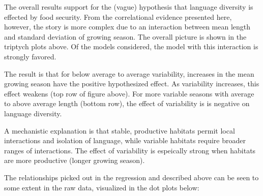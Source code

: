 \documentclass{article}
\begin{document}
The overall results support for the (vague) hypothesis that language diversity is effected by food security. 
From the correlational evidence presented here, however, the story is more complex due to an interaction between mean length and standard deviation of growing season.
The overall picture is shown in the triptych plots above.
Of the models considered, the model with this interaction is strongly favored.

The result is that for below average to average variability, increases in the mean growing season have the positive hypothesized effect. 
As variability increases, this effect weakens (top row of figure above).
For more variable seasons with average to above average length (bottom row), the effect of variability is is negative on language diversity. 

A mechanistic explanation is that stable, productive habitats permit local interactions and isolation of language, while variable habitats require broader ranges of interactions. 
The effect of variability is espeically strong when habitats are more productive (longer growing season).


The relationships picked out in the regression and described above can be seen to some extent in the raw data, visualized in the dot plots below: 
\end{document}
